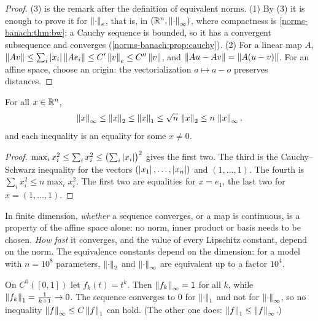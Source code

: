 \begin{notechapter}
\begin{proof}
(3) is the remark after the definition of equivalent norms. (1) By (3) it
is enough to prove it for $\left\|\cdot\right\|_e$, that is, in
$(\mathbb{R}^n, \left\|\cdot\right\|_\infty)$, where compactness is
\cref{norms-banach:thm:bw}; a Cauchy sequence is bounded, so it has a
convergent subsequence and converges
(\cref{norms-banach:prop:cauchy}). (2) For a linear map $A$,
$\left\|Av\right\|\leq\sum_i\left|x_i\right|\left\|Ae_i\right\|\leq C'\left\|v\right\|_e\leq C''\left\|v\right\|$,
and $\left\|Au - Av\right\| = \left\|A(u - v)\right\|$. For an affine space, choose an
origin: the vectorialization $a\mapsto a - o$ preserves distances.
\end{proof}

\begin{proposition}\label{norms-banach:prop:constants}
For all $x\in\mathbb{R}^n$,
\[
  \left\|x\right\|_\infty\leq\left\|x\right\|_2\leq\left\|x\right\|_1\leq\sqrt n\,\left\|x\right\|_2
  \leq n\,\left\|x\right\|_\infty ,
\]
and each inequality is an equality for some $x\neq0$.
\end{proposition}

\begin{proof}
$\max_ix_i^2\leq\sum_ix_i^2\leq\bigl(\sum_i\left|x_i\right|\bigr)^2$ gives the
first two. The third is the Cauchy--Schwarz inequality for the vectors
$(\left|x_1\right|,\dots,\left|x_n\right|)$ and $(1,\dots,1)$. The fourth is
$\sum_ix_i^2\leq n\max_ix_i^2$. The first two are equalities for $x = e_1$,
the last two for $x = (1,\dots,1)$.
\end{proof}

\begin{keyidea}
In finite dimension, \emph{whether} a sequence converges, or a map is
continuous, is a property of the affine space alone: no norm, inner product
or basis needs to be chosen. \emph{How fast} it converges, and the value of
every Lipschitz constant, depend on the norm. The equivalence constants
depend on the dimension: for a model with $n = 10^8$ parameters,
$\left\|\cdot\right\|_2$ and $\left\|\cdot\right\|_\infty$ are equivalent up to a factor
$10^4$.
\end{keyidea}

\begin{example}
\label{norms-banach:ex:not-equivalent}
On $C^0([0, 1])$ let $f_k(t) = t^k$. Then $\left\|f_k\right\|_\infty = 1$ for all
$k$, while $\left\|f_k\right\|_1 = \frac1{k + 1}\to0$. The sequence converges to
$0$ for $\left\|\cdot\right\|_1$ and not for $\left\|\cdot\right\|_\infty$, so no inequality
$\left\|f\right\|_\infty\leq C\left\|f\right\|_1$ can hold. (The other one does:
$\left\|f\right\|_1\leq\left\|f\right\|_\infty$.)
\end{example}


\end{notechapter}
